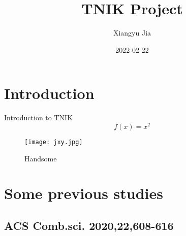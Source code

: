\documentclass{article}
\title{TNIK Project}
\date{2022-02-22}
\author{Xiangyu Jia}
\begin{document}
\maketitle
\newpage
{}

\section{Introduction}
Introduction to TNIK
\begin{equation}
f(x)=x^2
\end{equation}

\begin{figure}[h]
  \texttt{[image: jxy.jpg]}
  \caption{Handsome}
  \label{one handsome boy}
\end{figure}


\section{Some previous studies}
\subsection{ACS Comb.sci. 2020,22,608-616}
\end{document}
